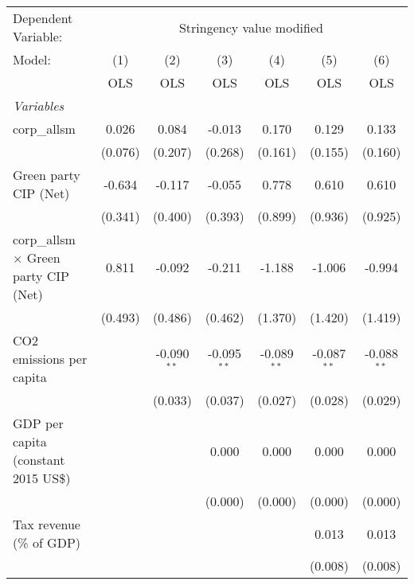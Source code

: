 
\begingroup
\centering
\begin{tabular}{lcccccc}
   \toprule
   Dependent Variable: & \multicolumn{6}{c}{Stringency value modified}\\
   Model:                                       & (1)     & (2)           & (3)           & (4)           & (5)           & (6)\\  
                                                &  OLS    & OLS           & OLS           & OLS           & OLS           & OLS\\  
   \midrule
   \emph{Variables}\\
   corp\_allsm                                  & 0.026   & 0.084         & -0.013        & 0.170         & 0.129         & 0.133\\   
                                                & (0.076) & (0.207)       & (0.268)       & (0.161)       & (0.155)       & (0.160)\\   
   Green party CIP (Net)                        & -0.634  & -0.117        & -0.055        & 0.778         & 0.610         & 0.610\\   
                                                & (0.341) & (0.400)       & (0.393)       & (0.899)       & (0.936)       & (0.925)\\   
   corp\_allsm $\times$ Green party CIP (Net)   & 0.811   & -0.092        & -0.211        & -1.188        & -1.006        & -0.994\\   
                                                & (0.493) & (0.486)       & (0.462)       & (1.370)       & (1.420)       & (1.419)\\   
   CO2 emissions per capita                     &         & -0.090$^{**}$ & -0.095$^{**}$ & -0.089$^{**}$ & -0.087$^{**}$ & -0.088$^{**}$\\   
                                                &         & (0.033)       & (0.037)       & (0.027)       & (0.028)       & (0.029)\\   
   GDP per capita (constant 2015 US\$)          &         &               & 0.000         & 0.000         & 0.000         & 0.000\\   
                                                &         &               & (0.000)       & (0.000)       & (0.000)       & (0.000)\\   
   Tax revenue (\% of GDP)                      &         &               &               &               & 0.013         & 0.013\\   
                                                &         &               &               &               & (0.008)       & (0.008)\\   

\end{tabular}
